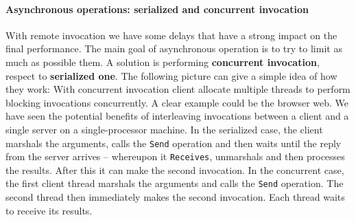 \paragraph{Asynchronous operations: serialized and concurrent invocation} With remote invocation we have some delays that have a strong impact on the final performance. The main goal of asynchronous operation is to try to limit as much as possible them. A solution is performing \textbf{concurrent invocation}, respect to \textbf{serialized one}. The following picture can give a simple idea of how they work:
With concurrent invocation client allocate multiple threads to perform blocking
invocations concurrently. A clear example could be the browser web. We have seen the potential benefits of interleaving invocations between a client and a single server on a single-processor machine. In the serialized case, the client marshals the arguments, calls the \verb|Send| operation and then waits until the reply from the server arrives – whereupon it \verb|Receives|, unmarshals and then processes the results. After this it can make the second invocation. In the concurrent case, the first client thread marshals the arguments and calls the \verb|Send| operation. The second thread then immediately makes the second invocation. Each thread waits to receive its results.

